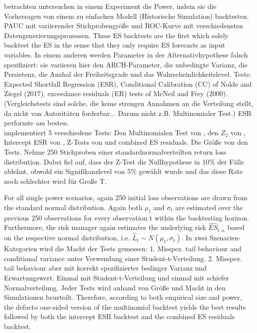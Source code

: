 \documentclass[12pt,a4paper]{article}
\begin{document}
	
	\cite{bayer_regression-based_2022} betrachten untersuchen in einem Experiment die Power, indem sie die Vorhersagen von einem zu einfachen Modell (Historische Simulation) backtesten. 
	PAUC mit variierender Stichprobengröße und ROC-Kurve mit verschiedensten Datengenerierungsprozessen.
	These ES backtests are the first which solely backtest the ES in the sense that they only require ES forecasts as input variables.
	In einem anderen werden Parameter in der Alternativhypothese falsch spezifiziert: sie variieren hier den ARCH-Parameter, die unbedingte Varianz, die Persistenz, die Anzhal der Freiheitsgrade und das Wahrscheinlichkeitslevel.
	Tests: Expected Shortfall Regression (ESR), Conditional Calibration (CC) of Nolde and Ziegel (2017), exceedance residuals (ER) tests of McNeil and Frey (2000).
	(Vergleichstests sind solche, die keine strengen Annahmen an die Verteilung stellt, da nicht von Autoritäten forderbar... 
	Darum nicht z.B. Multinomialer Test.)
	ESR performte am besten.\\

	
	\cite{spring_backtesting_2021} implementiert 5 verschiedene Tests: 
	Den Multinomialen Test von \cite{kratz_multinomial_2016}, 
	den $Z_2$ von \cite{acerbi_back-testing_2014},  
	Intercept ESR von \cite{bayer_regression-based_2022}, 
	Z-Tests von \cite{costanzino_backtesting_2015} und combined ES residuals. 
	Die Größe von den Tests. 
	Nehme 250 Stichproben einer standardnormalverteilten return loss distribution.
	Dabei fiel auf, dass der Z-Test die Nullhypothese in 10\% der Fälle ablehnt, obwohl ein Signifikanzlevel von 5\% gewählt wurde und das diese Rate noch schlechter wird für Große T.

	For all single power scenarios, again 250 initial loss observations are drawn from the standard normal distribution. Again both $\mu_t$ and $\sigma_t$ are estimated over the previous 250 observations for every observation t within the backtesting horizon. 
	Furthermore, the risk manager again estimates the underlying risk 
	$\widehat{ES}_{t,\alpha}$ based on the respective normal distribution, i.e. $\widehat{L}_t \sim N\left(\mu_t, \sigma_t \right)$.
	In zwei Szenarien-Kategorien wird die Macht der Tests gemessen:
	1. Misspez. tail behaviour and conditional variance unter Verwendung einer Student-t-Verteilung. 
	2. Misspez. tail behaviour aber mit korrekt spezifizierter bedinger Varianz und Erwartungswert.
	Einmal mit Student-t-Verteilung und einmal mit schiefer Normalverteilung.
	Jeder Tests wird anhand von Größe und Macht in den Simulationen beurteilt. 
	Therefore, according to both empirical size and power, the defacto one-sided version of the multinomial backtest yields the best results followed by both the intercept ESR backtest and the combined ES residuals backtest.\\
	
\end{document}
